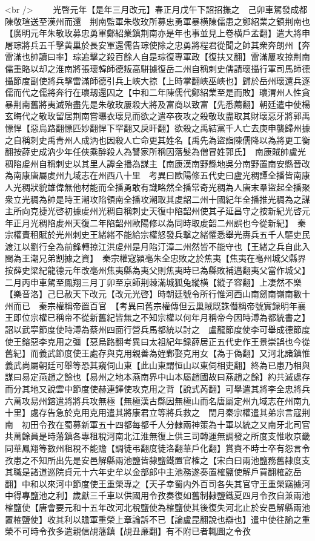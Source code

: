 <br />
　　光啓元年【是年三月改元】春正月戊午下詔招撫之　己卯車駕發成都陳敬瑄送至漢州而還　荆南監軍朱敬玫所募忠勇軍暴横陳儒患之鄭紹業之鎮荆南也【廣明元年朱敬玫募忠勇軍鄭紹業鎮荆南亦是年也事並見上卷横戶孟翻】遣大將申屠琮將兵五千擊黄巢於長安軍還儒告琮使除之忠勇將程君從聞之帥其衆奔朗州【奔雷滿也帥讀曰率】琮追擊之殺百餘人自是琮復專軍政【復扶又翻】雷滿屢攻掠荆南儒重賂以却之淮南將張瓌韓師德叛高駢據復岳二州自稱刺史儒請瓌攝行軍司馬師德攝節度副使將兵擊雷滿師德引兵上峽大掠【上時掌翻峽巫峽也】歸於岳州瓌還兵逐儒而代之儒將奔行在瓌刼還囚之【中和二年陳儒代鄭紹業至是而敗】瓌渭州人性貪暴荆南舊將夷滅殆盡先是朱敬玫屢殺大將及富商以致富【先悉薦翻】朝廷遣中使楊玄晦代之敬玫留居荆南嘗曝衣瓌見而欲之遣卒夜攻之殺敬玫盡取其財瓌惡牙將郭禹慓悍【惡烏路翻慓匹妙翻悍下罕翻又戾旰翻】欲殺之禹結黨千人亡去庚申襲歸州據之自稱刺史禹青州人成汭也因殺人亡命更其姓名【禹先為盜詣陳儒降以為將更工衡翻按薛史成汭少年任俠乘醉殺人為讐家所稱因落髮為僧冒姓郭氏】　南康賊帥盧光稠陷䖍州自稱刺史以其里人譚全播為謀主【南康漢南野縣地吳分南野置南安縣晉改為南康唐屬䖍州九域志在州西八十里　考異曰歐陽修五代史曰盧光稠譚全播皆南康人光稠狀貌雄偉無他材能而全播勇敢有識略然全播常奇光稠為人唐末羣盜起全播聚衆立光稠為帥是時王潮攻陷領南全播攻潮取其䖍韶二州十國紀年全播推光稠為之謀主所向克捷光啓初據䖍州光稠自稱刺史天復中陷韶州使其子延昌守之按新紀光啓元年正月光稠陷䖍州天復二年陷韶州歐陽修以為同時取䖍韶二州誤也今從新紀】　秦宗權責租賦於光州刺史王緒緒不能給宗權怒發兵撃之緒懼悉舉光夀兵五千人驅吏民渡江以劉行全為前鋒轉掠江洪䖍州是月陷汀漳二州然皆不能守也【王緒之兵自此入閩為王潮兄弟割據之資】　秦宗權寇潁亳朱全忠敗之於焦夷【焦夷在亳州城父縣界按薛史梁紀龍德元年改亳州焦夷縣為夷父則焦夷時已為縣敗補邁翻夷父當作城父】　二月丙申車駕至鳳翔三月丁卯至京師荆棘滿城狐兔縱横【縱子容翻】上凄然不樂【樂音洛】己巳赦天下改元【改元光啓】時朝廷號令所行惟河西山南劒南嶺南數十州而已　秦宗權稱帝置百官　【考異曰舊宗權傳但云巢賊既誅僭稱帝號實録明年襄王即位宗權已稱帝不從新舊紀皆無之不知宗權以何年月稱帝今因時溥為都統書之】詔以武寜節度使時溥為蔡州四面行營兵馬都統以討之　盧龍節度使李可舉成德節度使王鎔惡李克用之彊【惡烏路翻考異曰太祖紀年録薛居正五代史作王景崇誤也今從舊紀】而義武節度使王處存與克用親善為姪鄴娶克用女【為于偽翻】又河北諸鎮惟義武尚屬朝廷可舉等恐其窺伺山東【此山東謂恒山以東伺相吏翻】終為已患乃相與謀曰易定燕趙之餘也【易州之地本燕南界中山本屬趙國故曰燕趙之餘】約共滅處存而分其地又說雲中節度使赫連鐸使攻克用之背【說式芮翻】可舉遣其將李全忠將兵六萬攻易州鎔遣將將兵攻無極【無極漢古縣因無極山而名唐屬定州九域志在州南九十里】處存告急於克用克用遣其將康君立等將兵救之　閏月秦宗權遣其弟宗言寇荆南　初田令孜在蜀募新軍五十四都每都千人分隸兩神策為十軍以統之又南牙北司官共萬餘員是時藩鎮各專租稅河南北江淮無復上供三司轉運無調發之所度支惟收京畿同華鳳翔等數州租稅不能贍【調徒弔翻度徒洛翻華戶化翻】賞賚不時士卒有怨言令孜患之不知所出先是安邑解縣兩池鹽皆隸鹽鐵置官榷之【宋白曰兩池鹽務舊隸度支其職是諸道巡院貞元十六年史牟以金部郎中主池務遂奏置榷鹽使解戶買翻榷訖岳翻】中和以來河中節度使王重榮專之【天子幸蜀内外百司各失其官守王重榮竊據河中得專鹽池之利】歲獻三千車以供國用令孜奏復如舊制隸鹽鐵夏四月令孜自兼兩池榷鹽使【唐會要元和十五年改河北稅鹽使為榷鹽使其後復失河北止於安邑解縣兩池置榷鹽使】收其利以贍軍重榮上章論訴不已【論盧昆翻說也辯也】遣中使往諭之重榮不可時令孜多遣親信覘藩鎮【覘丑亷翻】有不附已者輒圖之令孜